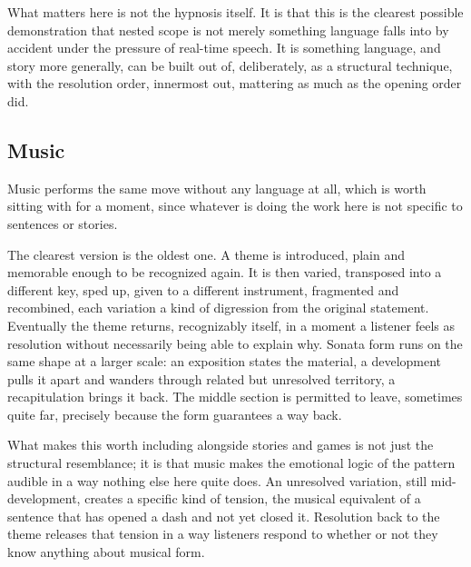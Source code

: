 \documentclass[11pt]{article}
\begin{document}
What matters here is not the hypnosis itself. It is that this is the clearest possible demonstration that nested scope is not merely something language falls into by accident under the pressure of real-time speech. It is something language, and story more generally, can be built out of, deliberately, as a structural technique, with the resolution order, innermost out, mattering as much as the opening order did.

\subsection{Music}

Music performs the same move without any language at all, which is worth sitting with for a moment, since whatever is doing the work here is not specific to sentences or stories.

The clearest version is the oldest one. A theme is introduced, plain and memorable enough to be recognized again. It is then varied, transposed into a different key, sped up, given to a different instrument, fragmented and recombined, each variation a kind of digression from the original statement. Eventually the theme returns, recognizably itself, in a moment a listener feels as resolution without necessarily being able to explain why. Sonata form runs on the same shape at a larger scale: an exposition states the material, a development pulls it apart and wanders through related but unresolved territory, a recapitulation brings it back. The middle section is permitted to leave, sometimes quite far, precisely because the form guarantees a way back.

What makes this worth including alongside stories and games is not just the structural resemblance; it is that music makes the emotional logic of the pattern audible in a way nothing else here quite does. An unresolved variation, still mid-development, creates a specific kind of tension, the musical equivalent of a sentence that has opened a dash and not yet closed it. Resolution back to the theme releases that tension in a way listeners respond to whether or not they know anything about musical form.
\end{document}
